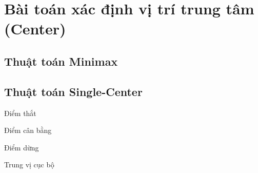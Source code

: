 \section{Bài toán xác định vị trí trung tâm (Center)}
\subsection{Thuật toán Minimax}
\subsection{Thuật toán Single-Center}
\begin{dn}{Điểm thắt}
\end{dn}

\begin{dn}{Điểm cân bằng}
\end{dn}

\begin{dl}{Điểm dừng}
\end{dl}

\begin{dn}{Trung vị cục bộ}
\end{dn}

\begin{hq}
\end{hq}



